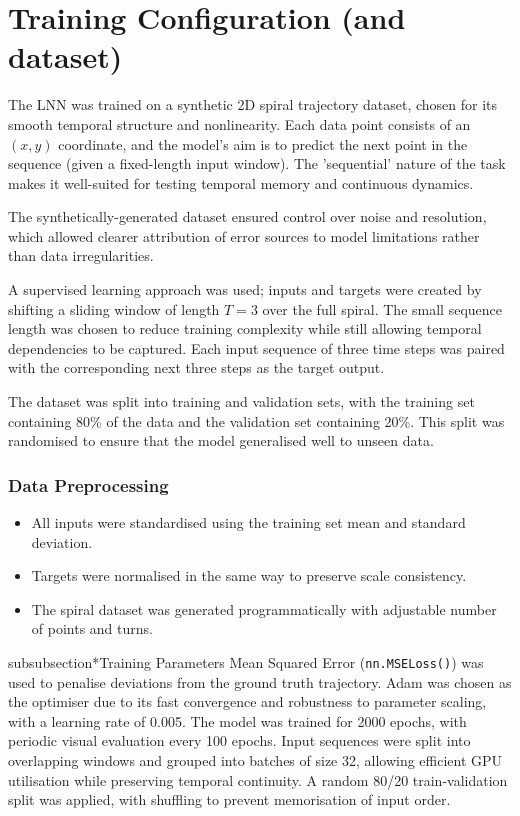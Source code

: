 \section{Training Configuration (and dataset)}
The LNN was trained on a synthetic 2D spiral trajectory dataset, chosen for its smooth temporal structure and nonlinearity. Each data point consists of an $(x, y)$ coordinate, and the model's aim is to predict the next point in the sequence (given a fixed-length input window). The 'sequential' nature of the task makes it well-suited for testing temporal memory and continuous dynamics.

The synthetically-generated dataset ensured control over noise and resolution, which allowed clearer attribution of error sources to model limitations rather than data irregularities.

A supervised learning approach was used; inputs and targets were created by shifting a sliding window of length $T = 3$ over the full spiral. The small sequence length was chosen to reduce training complexity while still allowing temporal dependencies to be captured. Each input sequence of three time steps was paired with the corresponding next three steps as the target output.

The dataset was split into training and validation sets, with the training set containing 80\% of the data and the validation set containing 20\%. This split was randomised to ensure that the model generalised well to unseen data.

\subsubsection*{Data Preprocessing}
\begin{itemize}
    \item All inputs were standardised using the training set mean and standard deviation.
    \item Targets were normalised in the same way to preserve scale consistency.
    \item The spiral dataset was generated programmatically with adjustable number of points and turns.
\end{itemize}

subsubsection*{Training Parameters}
Mean Squared Error (\texttt{nn.MSELoss()}) was used to penalise deviations from the ground truth trajectory. Adam was chosen as the optimiser due to its fast convergence and robustness to parameter scaling, with a learning rate of 0.005. The model was trained for 2000 epochs, with periodic visual evaluation every 100 epochs. Input sequences were split into overlapping windows and grouped into batches of size 32, allowing efficient GPU utilisation while preserving temporal continuity. A random 80/20 train-validation split was applied, with shuffling to prevent memorisation of input order.

